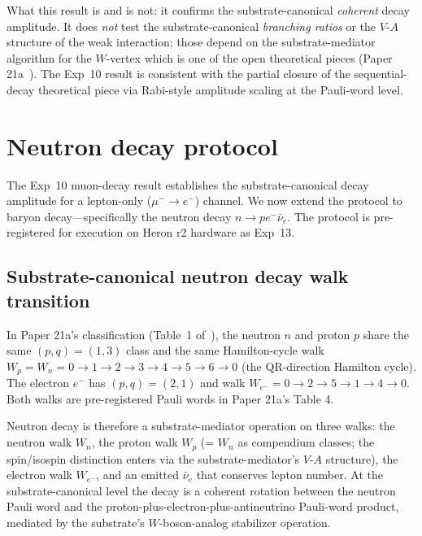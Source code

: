 \documentclass[11pt]{article}
\begin{document}
What this result is and is not: it confirms the substrate-canonical \emph{coherent} decay amplitude.  It does \emph{not} test the substrate-canonical \emph{branching ratios} or the $V$-$A$ structure of the weak interaction; those depend on the substrate-mediator algorithm for the $W$-vertex which is one of the open theoretical pieces (Paper 21a~\cite[\S 9.3]{Paper21a}).  The Exp~10 result is consistent with the partial closure of the sequential-decay theoretical piece via Rabi-style amplitude scaling at the Pauli-word level.

\section{Neutron decay protocol}
\label{sec:neutron-decay}

The Exp~10 muon-decay result establishes the substrate-canonical decay amplitude for a lepton-only ($\mu^- \to e^-$) channel.  We now extend the protocol to baryon decay---specifically the neutron decay $n \to p e^- \bar\nu_e$.  The protocol is pre-registered for execution on Heron r2 hardware as Exp~13.

\subsection{Substrate-canonical neutron decay walk transition}
\label{sec:neutron-decay-theory}

In Paper 21a's classification (Table~1 of~\cite{Paper21a}), the neutron $n$ and proton $p$ share the same $(p, q) = (1, 3)$ class and the same Hamilton-cycle walk $W_p = W_n = 0 \to 1 \to 2 \to 3 \to 4 \to 5 \to 6 \to 0$ (the QR-direction Hamilton cycle).  The electron $e^-$ has $(p, q) = (2, 1)$ and walk $W_{e^-} = 0 \to 2 \to 5 \to 1 \to 4 \to 0$.  Both walks are pre-registered Pauli words in Paper 21a's Table 4.

Neutron decay is therefore a substrate-mediator operation on three walks: the neutron walk $W_n$, the proton walk $W_p$ (= $W_n$ as compendium classes; the spin/isospin distinction enters via the substrate-mediator's $V$-$A$ structure), the electron walk $W_{e^-}$, and an emitted $\bar\nu_e$ that conserves lepton number.  At the substrate-canonical level the decay is a coherent rotation between the neutron Pauli word and the proton-plus-electron-plus-antineutrino Pauli-word product, mediated by the substrate's $W$-boson-analog stabilizer operation.
\end{document}
